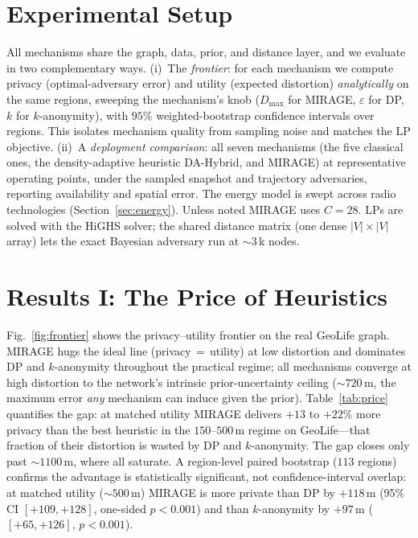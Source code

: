 \documentclass[11pt]{article}
\begin{document}
\section{Experimental Setup}
\label{sec:setup}
All mechanisms share the graph, data, prior, and distance layer, and we evaluate
in two complementary ways. (i)~The \emph{frontier}: for each mechanism we compute
privacy (optimal-adversary error) and utility (expected distortion)
\emph{analytically} on the same regions, sweeping the mechanism's knob ($D_{\max}$
for MIRAGE, $\varepsilon$ for DP, $k$ for $k$-anonymity), with $95\%$
weighted-bootstrap confidence intervals over regions. This isolates mechanism
quality from sampling noise and matches the LP objective. (ii)~A \emph{deployment
comparison}: all seven mechanisms (the five classical ones, the density-adaptive
heuristic DA-Hybrid, and MIRAGE) at representative operating points, under the
sampled snapshot and trajectory adversaries, reporting availability and spatial
error. The energy model is swept across radio technologies
(Section~\ref{sec:energy}). Unless noted MIRAGE uses $C{=}28$. LPs are solved with
the HiGHS solver; the shared distance matrix (one dense $|V|\times|V|$ array) lets
the exact Bayesian adversary run at $\sim$3\,k nodes.

\section{Results I: The Price of Heuristics}
\label{sec:price}
Fig.~\ref{fig:frontier} shows the privacy--utility frontier on the real GeoLife
graph. MIRAGE hugs the ideal line (privacy$\,=\,$utility) at low distortion and
dominates DP and $k$-anonymity throughout the practical regime; all mechanisms
converge at high distortion to the network's intrinsic prior-uncertainty ceiling
($\sim$$720$\,m, the maximum error \emph{any} mechanism can induce given the
prior). Table~\ref{tab:price} quantifies the gap: at matched utility MIRAGE
delivers $+13$ to $+22\%$ more privacy than the best heuristic in the
$150$--$500$\,m regime on GeoLife---that fraction of their distortion is wasted by
DP and $k$-anonymity. The gap closes only past $\sim$$1100$\,m, where all saturate.
A region-level paired bootstrap ($113$ regions) confirms the advantage is
statistically significant, not confidence-interval overlap: at matched utility
($\sim$$500$\,m) MIRAGE is more private than DP by $+118$\,m (95\% CI
$[+109,+128]$, one-sided $p<0.001$) and than $k$-anonymity by $+97$\,m
($[+65,+126]$, $p<0.001$).
\end{document}
